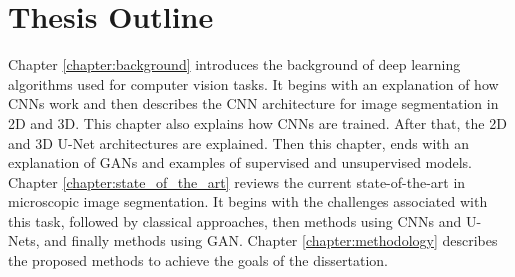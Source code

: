 
\section{Thesis Outline}

Chapter \ref{chapter:background} introduces the background of deep learning algorithms used for computer vision tasks. It begins with an explanation of how \ac{CNNs} work and then describes the \ac{CNN} architecture for image segmentation in \ac{2D} and \ac{3D}. This chapter also explains how \ac{CNNs} are trained. After that, the \ac{2D} and \ac{3D} U-Net architectures are explained. Then this chapter, ends with an explanation of \ac{GANs} and examples of supervised and unsupervised models. Chapter \ref{chapter:state_of_the_art} reviews the current state-of-the-art in microscopic image segmentation. It begins with the challenges associated with this task, followed by classical approaches, then methods using \ac{CNNs} and U-Nets, and finally methods using \ac{GAN}. Chapter \ref{chapter:methodology} describes the proposed methods to achieve the goals of the dissertation. 